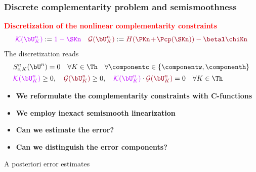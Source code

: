 %
\begin{frame}
\frametitle{Discrete complementarity problem and semismoothness}
\textcolor{red}{\textbf{Discretization of the nonlinear complementarity constraints}}
\begin{equation*}
\textcolor{electricpurple}{\mathcal{K}(\bU_K^n)} \egaldef \textcolor{electricpurple}{1-\SKn} \quad \textcolor{carmine} {\mathcal{G}(\bU_K^n)} \egaldef  \textcolor{carmine}{H(\PKn\hspace{-0.05 cm}+\hspace{-0.05 cm}\Pcp(\SKn))-\betal \chiKn}
\end{equation*}
\pause
The discretization reads
\begin{equation*}
\begin{split}
&S_{c,K}^n(\bU^n)=0 \quad \forall K \in \Th \quad \forall \componentc \in \left\{\componentw,\componenth \right\}\\
& \textcolor{electricpurple}{\mathcal{K}(\bU_K^n)} \geq 0, \quad   \textcolor{carmine} {\mathcal{G}(\bU_K^n)} \geq 0, \quad \textcolor{electricpurple}{\mathcal{K}(\bU_K^n)} \cdot \textcolor{carmine} {\mathcal{G}(\bU_K^n)}=0 \quad \forall K \in \Th
\end{split}
\end{equation*}
\pause
\begin{itemize}
\item
\textcolor{cadmiumgreen}{\textbf{We reformulate the complementarity constraints with C-functions}}
\item
\textcolor{cadmiumgreen}{\textbf{We employ inexact semismooth linearization}}
\item
\textcolor{cadmiumgreen}{\textbf{Can we estimate the error?}}
\item
\textcolor{cadmiumgreen}{\textbf{Can we distinguish the error components?}}
\end{itemize}
\end{frame} 
%
\begin{frame}[noframenumbering]
\centering
\Huge{\textcolor{carmine}{A posteriori error estimates}}
\end{frame}
